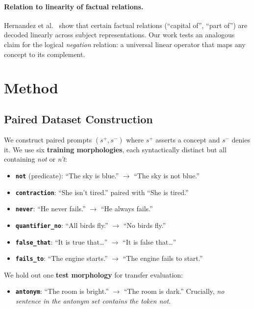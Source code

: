 \documentclass{article}
\begin{document}
\paragraph{Relation to linearity of factual relations.}
Hernandez et al.\ \citep{hernandez2023linearity} show that certain factual relations (``capital of'', ``part of'') are decoded linearly across subject representations.
Our work tests an analogous claim for the logical \emph{negation} relation: a universal linear operator that maps any concept to its complement.

\section{Method}
\label{sec:method}

\subsection{Paired Dataset Construction}
\label{sec:data}

We construct paired prompts $(s^+, s^-)$ where $s^+$ asserts a concept and $s^-$ denies it.
We use six \textbf{training morphologies}, each syntactically distinct but all containing \textit{not} or \textit{n't}:

\begin{itemize}
  \item \textbf{\texttt{not}} (predicate): ``The sky is blue.'' $\to$ ``The sky is not blue.''
  \item \textbf{\texttt{contraction}}: ``She isn't tired.'' paired with ``She is tired.''
  \item \textbf{\texttt{never}}: ``He never fails.'' $\to$ ``He always fails.''
  \item \textbf{\texttt{quantifier\_no}}: ``All birds fly.'' $\to$ ``No birds fly.''
  \item \textbf{\texttt{false\_that}}: ``It is true that\ldots'' $\to$ ``It is false that\ldots''
  \item \textbf{\texttt{fails\_to}}: ``The engine starts.'' $\to$ ``The engine fails to start.''
\end{itemize}

We hold out one \textbf{test morphology} for transfer evaluation:
\begin{itemize}
  \item \textbf{\texttt{antonym}}: ``The room is bright.'' $\to$ ``The room is dark.''
    Crucially, \emph{no sentence in the antonym set contains the token \textit{not}}.
\end{itemize}
\end{document}
